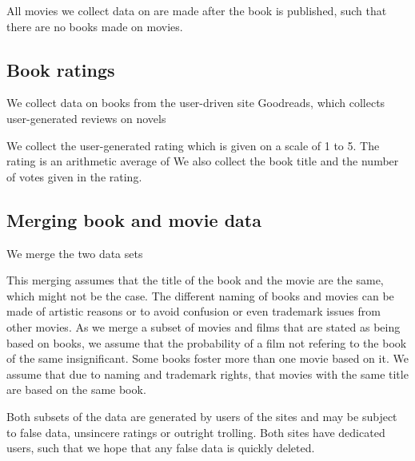 \documentclass[12pt]{article}
\begin{document}
All movies we collect data on are made after the book is published, such that there are no books made on movies. 

\subsection{Book ratings} %
\label{sub:book_ratings}
We collect data on books from the user-driven site Goodreads, which collects user-generated reviews on novels

We collect the user-generated rating which is given on a scale of 1 to 5. The rating is an arithmetic average of We also collect the book title and the number of votes given in the rating. 


\subsection{Merging book and movie data}
We merge the two data sets

This merging assumes that the title of the book and the movie are the same, which might not be the case. The different naming of books and movies can be made of artistic reasons or to avoid confusion or even trademark issues from other movies. As we merge a subset of movies and films that are stated as being based on books, we assume that the probability of a film not refering to the book of the same insignificant. Some books foster more than one movie based on it. We assume that due to naming and trademark rights, that movies with the same title are based on the same book.


Both subsets of the data are generated by users of the sites and may be subject to false data, unsincere ratings or outright trolling. Both sites have dedicated users, such that we hope that any false data is quickly deleted. 
\end{document}
